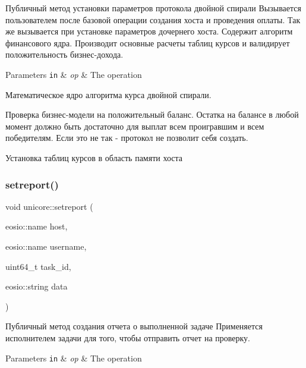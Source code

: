 Публичный метод установки параметров протокола двойной спирали Вызывается пользователем после базовой операции создания хоста и проведения оплаты. Так же вызывается при установке параметров дочернего хоста. Содержит алгоритм финансового ядра. Производит основные расчеты таблиц курсов и валидирует положительность бизнес-\/дохода. 


\begin{DoxyParams}[1]{Parameters}
\mbox{\tt in}  & {\em op} & The operation \\
\hline
\end{DoxyParams}
Математическое ядро алгоритма курса двойной спирали.

Проверка бизнес-\/модели на положительный баланс. Остатка на балансе в любой момент должно быть достаточно для выплат всем проигравшим и всем победителям. Если это не так -\/ протокол не позволит себя создать.

Установка таблиц курсов в область памяти хоста\mbox{\label{classeosio_1_1unicore_a178fc39ee1d642454bddeaa3f6084d00}} 
\subsubsection{\texorpdfstring{setreport()}{setreport()}}
{\footnotesize\ttfamily void unicore\+::setreport (\begin{DoxyParamCaption}\item[{eosio\+::name}]{host,  }\item[{eosio\+::name}]{username,  }\item[{uint64\+\_\+t}]{task\+\_\+id,  }\item[{eosio\+::string}]{data }\end{DoxyParamCaption})}



Публичный метод создания отчета о выполненной задаче Применяется исполнителем задачи для того, чтобы отправить отчет на проверку. 


\begin{DoxyParams}[1]{Parameters}
\mbox{\tt in}  & {\em op} & The operation \\
\hline
\end{DoxyParams}
\mbox{\label{classeosio_1_1unicore_acfa60cf59df336c954662c1ae46a67b2}} 
